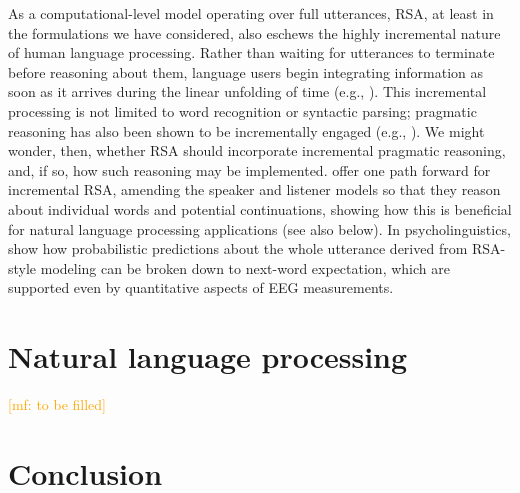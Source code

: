 \documentclass{sp}
\newcommand{\mf}[1]{\textcolor{orange}{[mf: #1]}}
\newcommand{\mht}[1]{\textcolor{purple}{[mht: #1]}}
\begin{document}
As a computational-level model operating over full utterances, RSA, at least in the formulations we have considered, also eschews the highly incremental nature of human language processing. Rather than waiting for utterances to terminate before reasoning about them, language users begin integrating information as soon as it arrives during the linear unfolding of time (e.g., \citealp{tanenhausetal1995}). This incremental processing is not limited to word recognition or syntactic parsing; pragmatic reasoning has also been shown to be incrementally engaged (e.g., \citealp{sedivyetal1999,sedivy2007}). We might wonder, then, whether RSA should incorporate incremental pragmatic reasoning, and, if so, how such reasoning may be implemented. \cite{cohngordgonetal2019} offer one path forward for incremental RSA, amending the speaker and listener models so that they reason about individual words and potential continuations, showing how this is beneficial for natural language processing applications (see also below).
In psycholinguistics, \citet{WerningCosentino2017:The-interaction,AugurzkyFranke2019:Gricean-expecta} show how probabilistic predictions about the whole utterance derived from RSA-style modeling can be broken down to next-word expectation, which are supported even by quantitative aspects of EEG measurements.

\section{Natural language processing}

\mf{to be filled}



\section{Conclusion} \label{summary}
\end{document}
